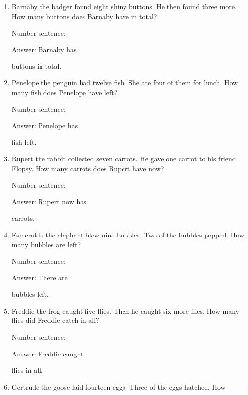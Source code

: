 \documentclass{tufte-book}
\begin{document}
\begin{enumerate}

\item
  Barnaby the badger found eight shiny buttons. He then found three
  more. How many buttons does Barnaby have in total?\medskip\par
  Number sentence:
  \dotfill\medskip\par
  Answer: Barnaby has
  \dotfill\medskip\par\mbox{}\dotfill\medskip\par\mbox{}\dotfill\bigskip
  buttons in total.
\item
  Penelope the penguin had twelve fish. She ate four of them for lunch.
  How many fish does Penelope have left?\medskip\par
  Number sentence:
  \dotfill\medskip\par
  Answer: Penelope has
  \dotfill\medskip\par\mbox{}\dotfill\medskip\par\mbox{}\dotfill\bigskip
  fish left.
\item
  Rupert the rabbit collected seven carrots. He gave one carrot to his
  friend Flopsy. How many carrots does Rupert have now?\medskip\par
  Number sentence:
  \dotfill\medskip\par
  Answer: Rupert now has
  \dotfill\medskip\par\mbox{}\dotfill\medskip\par\mbox{}\dotfill\bigskip
  carrots.
\item
  Esmeralda the elephant blew nine bubbles. Two of the bubbles popped.
  How many bubbles are left?\medskip\par
  Number sentence:
  \dotfill\medskip\par
  Answer: There are
  \dotfill\medskip\par\mbox{}\dotfill\medskip\par\mbox{}\dotfill\bigskip
  bubbles left.
\item
  Freddie the frog caught five flies. Then he caught six more flies. How
  many flies did Freddie catch in all?\medskip\par
  Number sentence:
  \dotfill\medskip\par
  Answer: Freddie caught
  \dotfill\medskip\par\mbox{}\dotfill\medskip\par\mbox{}\dotfill\bigskip
  flies in all.
\item
  Gertrude the goose laid fourteen eggs. Three of the eggs hatched. How

\end{enumerate}
\end{document}
